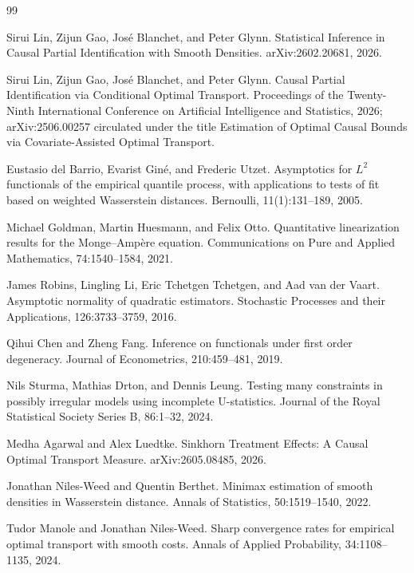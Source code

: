 \documentclass{article}
\begin{document}
\begin{thebibliography}{99}

   Sirui Lin, Zijun Gao, Jos\'e Blanchet, and Peter Glynn. Statistical Inference in Causal Partial Identification with Smooth Densities. arXiv:2602.20681, 2026.

   Sirui Lin, Zijun Gao, Jos\'e Blanchet, and Peter Glynn. Causal Partial Identification via Conditional Optimal Transport. Proceedings of the Twenty-Ninth International Conference on Artificial Intelligence and Statistics, 2026; arXiv:2506.00257 circulated under the title Estimation of Optimal Causal Bounds via Covariate-Assisted Optimal Transport.

   Eustasio del Barrio, Evarist Gin\'e, and Frederic Utzet. Asymptotics for \(L^2\) functionals of the empirical quantile process, with applications to tests of fit based on weighted Wasserstein distances. Bernoulli, 11(1):131--189, 2005.

   Michael Goldman, Martin Huesmann, and Felix Otto. Quantitative linearization results for the Monge--Amp\`ere equation. Communications on Pure and Applied Mathematics, 74:1540--1584, 2021.

   James Robins, Lingling Li, Eric Tchetgen Tchetgen, and Aad van der Vaart. Asymptotic normality of quadratic estimators. Stochastic Processes and their Applications, 126:3733--3759, 2016.

   Qihui Chen and Zheng Fang. Inference on functionals under first order degeneracy. Journal of Econometrics, 210:459--481, 2019.

   Nils Sturma, Mathias Drton, and Dennis Leung. Testing many constraints in possibly irregular models using incomplete U-statistics. Journal of the Royal Statistical Society Series B, 86:1--32, 2024.

   Medha Agarwal and Alex Luedtke. Sinkhorn Treatment Effects: A Causal Optimal Transport Measure. arXiv:2605.08485, 2026.

   Jonathan Niles-Weed and Quentin Berthet. Minimax estimation of smooth densities in Wasserstein distance. Annals of Statistics, 50:1519--1540, 2022.

   Tudor Manole and Jonathan Niles-Weed. Sharp convergence rates for empirical optimal transport with smooth costs. Annals of Applied Probability, 34:1108--1135, 2024.


\end{thebibliography}
\end{document}
